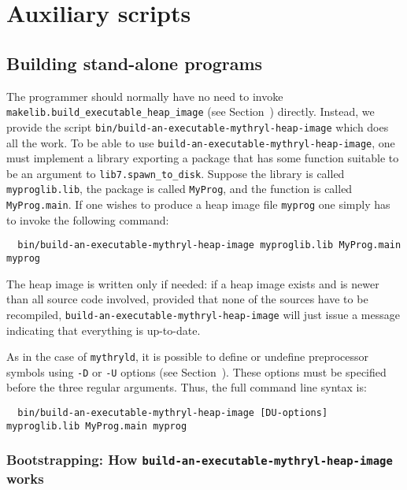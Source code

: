 
\section{Auxiliary scripts}

\subsection{Building stand-alone programs}
\label{sec:build-an-executabe-heap-image}

The programmer should normally have no need to invoke {\tt
makelib.build_executable_heap_image} (see Section~) directly.
Instead, we provide the script {\tt bin/build-an-executable-mythryl-heap-image} which does all the
work.  To be able to use {\tt build-an-executable-mythryl-heap-image}, one must implement a library
exporting a package that has some function suitable to be an
argument to {\tt lib7.spawn_to_disk}.  Suppose the library is called
{\tt myproglib.lib}, the package is called {\tt MyProg}, and the
function is called {\tt MyProg.main}.  If one wishes to produce a heap
image file {\tt myprog} one simply has to invoke the following
command:

\begin{verbatim}
  bin/build-an-executable-mythryl-heap-image myproglib.lib MyProg.main myprog
\end{verbatim}

The heap image is written only if needed: if a heap image exists and
is newer than all source code involved, provided that none of the
sources have to be recompiled, {\tt build-an-executable-mythryl-heap-image}
will just issue a message indicating that everything is up-to-date.

As in the case of {\tt mythryld}, it is possible to define or undefine
preprocessor symbols using {\tt -D} or {\tt -U} options (see
Section~).  These options must be specified
before the three regular arguments.  Thus, the full command line
syntax is:

\begin{verbatim}
  bin/build-an-executable-mythryl-heap-image [DU-options] myproglib.lib MyProg.main myprog
\end{verbatim}

\subsubsection{Bootstrapping: How {\tt build-an-executable-mythryl-heap-image} works}

